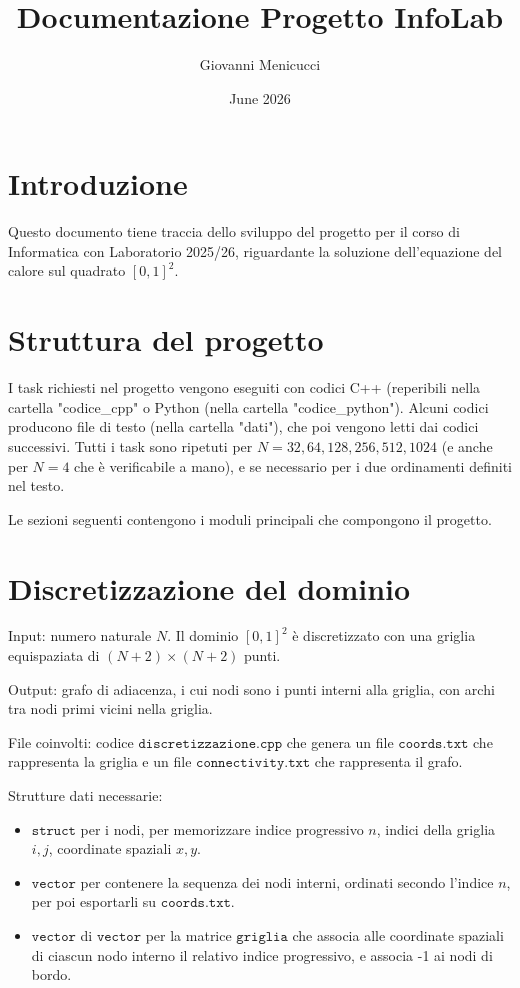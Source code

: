 \documentclass{article}
\title{Documentazione Progetto InfoLab}
\author{Giovanni Menicucci}
\date{June 2026}
\begin{document}
\maketitle

\section{Introduzione}
Questo documento tiene traccia dello sviluppo del progetto per il corso di Informatica con Laboratorio 2025/26, riguardante la soluzione dell'equazione del calore sul quadrato $[0,1]^2$.

\section{Struttura del progetto}
I task richiesti nel progetto vengono eseguiti con codici C++ (reperibili nella cartella "codice\_cpp" o Python (nella cartella "codice\_python").
Alcuni codici producono file di testo (nella cartella "dati"), che poi vengono letti dai codici successivi.
Tutti i task sono ripetuti per $N = 32, 64,128,256,512,1024$ (e anche per $N = 4$ che è verificabile a mano), e se necessario per i due ordinamenti definiti nel testo.  

Le sezioni seguenti contengono i moduli principali che compongono il progetto.

\section{Discretizzazione del dominio}
Input: numero naturale $N$.
Il dominio $[0,1]^2$ è discretizzato con una griglia equispaziata di $(N+2) \times (N+2)$ punti.

Output: grafo di adiacenza, i cui nodi sono i punti interni alla griglia, con archi tra nodi primi vicini nella griglia.

File coinvolti: codice $\texttt{discretizzazione.cpp}$ che genera un file $\texttt{coords.txt}$ che rappresenta la griglia e un file $\texttt{connectivity.txt}$ che rappresenta il grafo.

Strutture dati necessarie: 
\begin{itemize}
\item $\texttt{struct}$ per i nodi, per memorizzare indice progressivo $n$, indici della griglia $i,j$, coordinate spaziali $x,y$.
\item $\texttt{vector}$ per contenere la sequenza dei nodi interni, ordinati secondo l'indice $n$, per poi esportarli su $\texttt{coords.txt}$.
\item $\texttt{vector}$ di $\texttt{vector}$ per la matrice $\texttt{griglia}$ che associa alle coordinate spaziali di ciascun nodo interno il relativo indice progressivo, e associa -1 ai nodi di bordo.
\end{itemize}
\end{document}
